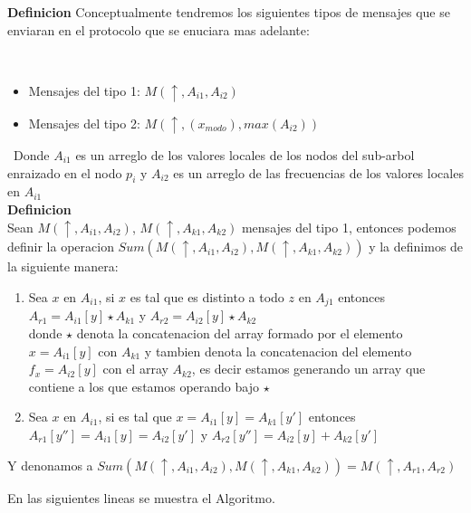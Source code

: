 \documentclass[11pt]{article}
\begin{document}
\textbf{Definicion}
Conceptualmente tendremos los siguientes tipos de mensajes que se enviaran en el protocolo que se enuciara
mas adelante:

\
\begin{itemize}
    \item Mensajes del tipo 1: $M(\uparrow, A_{i1},A_{i2}) $
    \item Mensajes del tipo 2: $ M(\uparrow,(x_{modo}), max(A_{i2}))$
\end{itemize}
\
Donde $A_{i1}$ es un arreglo de los valores locales de los nodos del sub-arbol enraizado
en el nodo $p_{i}$ y $A_{i2}$ es un arreglo de las frecuencias de los valores locales en $A_{i1}$
\\

\textbf{Definicion}\\
Sean $M(\uparrow, A_{i1}, A_{i2})$, $M(\uparrow, A_{k1}, A_{k2})$ mensajes del tipo 1, entonces podemos definir la operacion $Sum(M(\uparrow, A_{i1}, A_{i2}), M(\uparrow, A_{k1}, A_{k2}))$ y la definimos
de la siguiente manera:\\
\begin{enumerate}
    \item Sea $x$ en $A_{i1}$, si $x$ es tal que es distinto a todo $z$ en $A_{j1}$
     entonces \\ $A_{r1} = A_{i1}[y] \star A_{k1}$ y $A_{r2} = A_{i2}[y] \star A_{k2}$ \\
     donde $\star$ denota la concatenacion del array formado por el elemento  $x = A_{i1}[y]$ con $A_{k1}$ y tambien denota
     la concatenacion del elemento $f_{x} = A_{i2}[y]$ con el array $A_{k2}$, es decir estamos generando un array
     que contiene a los que estamos operando bajo $\star$
    \item Sea $x$ en $A_{i1}$, si es tal que $x = A_{i1}[y] = A_{k1}[y']$ entonces $A_{r1}[y''] = A_{i1}[y] = A_{i2}[y']$  y
    $A_{r2}[y''] = A_{i2}[y] + A_{k2}[y']$
\end{enumerate}

Y denonamos a $Sum(M(\uparrow,A_{i1}, A_{i2}), M(\uparrow, A_{k1}, A_{k2})) = M(\uparrow, A_{r1}, A_{r2})$

\newpage

En las siguientes lineas se muestra el Algoritmo.
\end{document}
